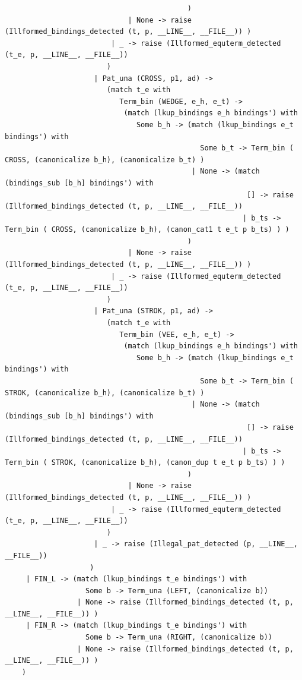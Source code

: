 \documentclass[12pt]{article}
\begin{document}
\begin{tiny}
\begin{verbatim}
                                           )
                             | None -> raise (Illformed_bindings_detected (t, p, __LINE__, __FILE__)) )
                         | _ -> raise (Illformed_equterm_detected (t_e, p, __LINE__, __FILE__))
                        )
                     | Pat_una (CROSS, p1, ad) ->
                        (match t_e with
                           Term_bin (WEDGE, e_h, e_t) ->
                            (match (lkup_bindings e_h bindings') with
                               Some b_h -> (match (lkup_bindings e_t bindings') with
                                              Some b_t -> Term_bin ( CROSS, (canonicalize b_h), (canonicalize b_t) )
                                            | None -> (match (bindings_sub [b_h] bindings') with
                                                         [] -> raise (Illformed_bindings_detected (t, p, __LINE__, __FILE__))
                                                        | b_ts -> Term_bin ( CROSS, (canonicalize b_h), (canon_cat1 t e_t p b_ts) ) )
                                           )
                             | None -> raise (Illformed_bindings_detected (t, p, __LINE__, __FILE__)) )
                         | _ -> raise (Illformed_equterm_detected (t_e, p, __LINE__, __FILE__))
                        )
                     | Pat_una (STROK, p1, ad) ->
                        (match t_e with
                           Term_bin (VEE, e_h, e_t) ->
                            (match (lkup_bindings e_h bindings') with
                               Some b_h -> (match (lkup_bindings e_t bindings') with
                                              Some b_t -> Term_bin ( STROK, (canonicalize b_h), (canonicalize b_t) )
                                            | None -> (match (bindings_sub [b_h] bindings') with
                                                         [] -> raise (Illformed_bindings_detected (t, p, __LINE__, __FILE__))
                                                        | b_ts -> Term_bin ( STROK, (canonicalize b_h), (canon_dup t e_t p b_ts) ) )
                                           )
                             | None -> raise (Illformed_bindings_detected (t, p, __LINE__, __FILE__)) )
                         | _ -> raise (Illformed_equterm_detected (t_e, p, __LINE__, __FILE__))
                        )
                     | _ -> raise (Illegal_pat_detected (p, __LINE__, __FILE__))
                    )
     | FIN_L -> (match (lkup_bindings t_e bindings') with
                   Some b -> Term_una (LEFT, (canonicalize b))
                 | None -> raise (Illformed_bindings_detected (t, p, __LINE__, __FILE__)) )
     | FIN_R -> (match (lkup_bindings t_e bindings') with
                   Some b -> Term_una (RIGHT, (canonicalize b))
                 | None -> raise (Illformed_bindings_detected (t, p, __LINE__, __FILE__)) )
    )



\end{verbatim}
\end{tiny}
\end{document}
